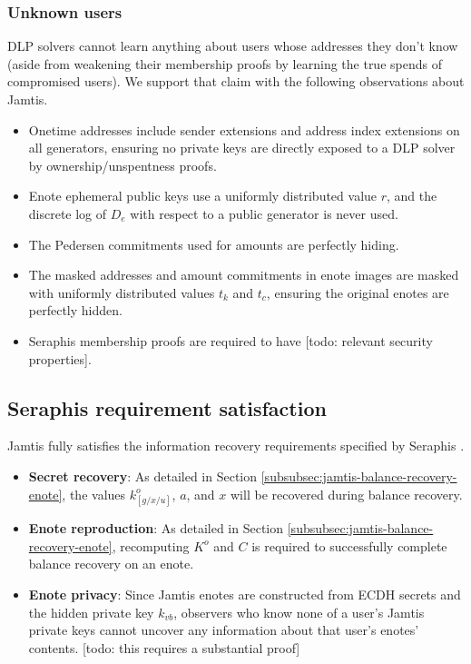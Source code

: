 \subsubsection{Unknown users}
\label{subsubsec:jamtis-forward-secrecy-unknown-users}

DLP solvers cannot learn anything about users whose addresses they don't know (aside from weakening their membership proofs by learning the true spends of compromised users). We support that claim with the following observations about Jamtis.
\begin{itemize}
    \item Onetime addresses include sender extensions and address index extensions on all generators, ensuring no private keys are directly exposed to a DLP solver by ownership/unspentness proofs.
    \item Enote ephemeral public keys use a uniformly distributed value $r$, and the discrete log of $D_e$ with respect to a public generator is never used.
    \item The Pedersen commitments used for amounts are perfectly hiding.
    \item The masked addresses and amount commitments in enote images are masked with uniformly distributed values $t_k$ and $t_c$, ensuring the original enotes are perfectly hidden.
    \item Seraphis membership proofs are required to have [todo: relevant security properties].
\end{itemize}


\subsection{Seraphis requirement satisfaction}
\label{subsec:jamtis-seraphis-requirements}

Jamtis fully satisfies the information recovery requirements specified by Seraphis \cite{seraphis}.

\begin{itemize}
    \item \textbf{Secret recovery}: As detailed in Section \ref{subsubsec:jamtis-balance-recovery-enote}, the values $k^o_{[g/x/u]}$, $a$, and $x$ will be recovered during balance recovery.

    \item \textbf{Enote reproduction}: As detailed in Section \ref{subsubsec:jamtis-balance-recovery-enote}, recomputing $K^o$ and $C$ is required to successfully complete balance recovery on an enote.

    \item \textbf{Enote privacy}: Since Jamtis enotes are constructed from ECDH secrets and the hidden private key $k_{vb}$, observers who know none of a user's Jamtis private keys cannot uncover any information about that user's enotes' contents. [todo: this requires a substantial proof]
\end{itemize}



